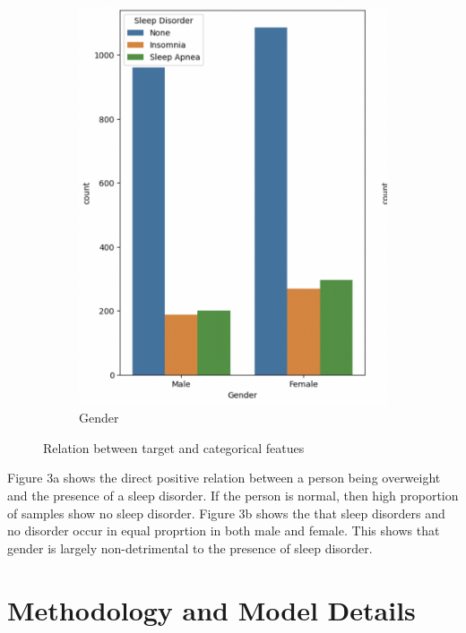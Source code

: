 \documentclass[10pt,twocolumn,letterpaper]{article}
\begin{document}
\begin{figure}[H]
\begin{subfigure}{.3\textwidth}
  \includegraphics[width=0.8\linewidth]{relationplot2.png}
  \caption{Gender}
  \label{fig:sub2}
\end{subfigure}
\caption{Relation between target and categorical featues}
\label{fig:test}
\end{figure}
Figure 3a shows the direct positive relation between a person being overweight and the presence of a sleep disorder. If the person is normal, then high proportion of samples show no sleep disorder. Figure 3b shows the that sleep disorders and no disorder occur in equal proprtion in both male and female. This shows that gender is largely non-detrimental to the presence of sleep disorder.
\section{Methodology and Model Details}
\end{document}
